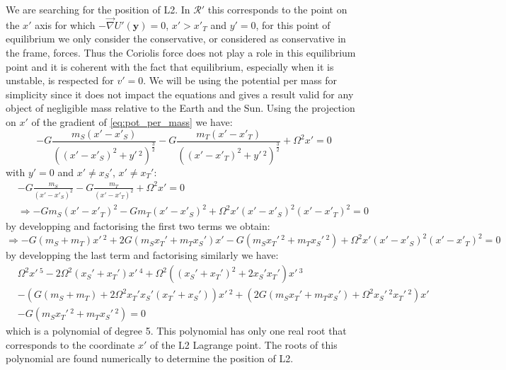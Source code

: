 We are searching for the position of L2. In $\mathcal{R}'$ this corresponds to the point on the $x'$ axis for which $-\vec{\nabla}U'(\mathbf{y}) = 0$, $x' > x'_T$ and $y' = 0$, for this point of equilibrium we only consider the conservative, or considered as conservative in the frame, forces. Thus the Coriolis force does not play a role in this equilibrium point and it is coherent with the fact that equilibrium, especially when it is unstable, is respected for $v'=0$. We will be using the potential per mass for simplicity since it does not impact the equations and gives a result valid for any object of negligible mass relative to the Earth and the Sun. Using the projection on $x'$ of the gradient of \autoref{eq:pot_per_mass} we have:
\begin{equation}
    - G \frac{m_S(x' - x'_S)}{\left((x' - x'_S)^2 + y'\,^2\right)^\frac{3}{2}} - G \frac{m_T(x' - x'_T)}{\left((x' - x'_T)^2 + y'\,^2\right)^\frac{3}{2}} + \Omega^2 x' = 0
\end{equation}
with $y' = 0$ and $x' \neq x_S'$, $x' \neq x_T'$:
\begin{equation}
    \begin{aligned}
        &-G\frac{m_S}{(x'-x'_S)^2} -G\frac{m_T}{(x'-x'_T)^2} + \Omega^2 x' = 0 \\
        & \Rightarrow -Gm_S(x'-x'_T)^2 - Gm_T(x'-x'_S)^2 + \Omega^2 x'(x'-x'_S)^2(x'-x'_T)^2 = 0
    \end{aligned}
\end{equation}
by developping and factorising the first two terms we obtain:
\begin{equation}
    \Rightarrow -G(m_S+m_T)x'\,^2 + 2G(m_Sx_T' + m_Tx_S')x' - G(m_Sx_T'\,^2 + m_Tx_S'\,^2) + \Omega^2 x'(x'-x'_S)^2(x'-x'_T)^2 = 0
\end{equation}
by developping the last term and factorising similarly we have:
\begin{equation}
    \begin{aligned}
            &\Omega^2 x'\,^5 - 2\Omega^2(x_S' + x_T')x'\,^4 + \Omega^2\left((x_S' + x_T')^2 + 2x_S'x_T'\right)x'\,^3 \\
            &- \left(G(m_S+m_T) + 2\Omega^2 x_T'x_S'(x_T' + x_S')\right)x'\,^2 + \left(2G(m_Sx_T' + m_Tx_S') + \Omega^2x_S'\,^2x_T'\,^2\right)x'  \\
            &- G\left(m_Sx_T'\,^2 + m_Tx_S'\,^2\right) = 0
    \end{aligned}
\end{equation}
which is a polynomial of degree 5. This polynomial has only one real root that corresponds to the coordinate $x'$ of the L2 Lagrange point. The roots of this polynomial are found numerically to determine the position of L2.
